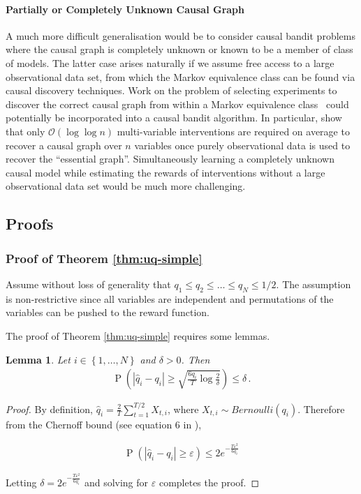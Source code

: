 \documentclass[11pt,a4paper,twoside]{report}
\newcommand{\set}[1]{\left\{#1\right\}}
\newcommand{\eq}[1]{\begin{align*}#1\end{align*}}
\newcommand{\bigo}[1]{\mathcal{O}\left( #1 \right)}
\renewcommand{\P}[1]{\operatorname{P}\left(#1\right)}
\theoremstyle{plain}
\newtheorem{lemma}[theorem]{Lemma}
\theoremstyle{definition}
\let\epsilon\varepsilon
\begin{document}
\paragraph{Partially or Completely Unknown Causal Graph}
A much more difficult generalisation would be to consider causal bandit problems where the causal graph is completely unknown or known to be a member of class of models.
The latter case arises naturally if we assume free access to a large observational data set, from which the Markov equivalence class can be found via causal discovery techniques. 
Work on the problem of selecting experiments to discover the correct causal graph from within a Markov equivalence class~\citep{eberhardt2005,eberhardt2010causal,hauser2014two,Hu2014} could potentially be incorporated into a causal bandit algorithm.
In particular, \citet{Hu2014} show that only $\bigo{\log \log n}$ multi-variable interventions are required on average to recover a causal graph over $n$ variables once purely observational data is used to recover the ``essential graph''.
Simultaneously learning a completely unknown causal model while estimating the rewards of interventions without a large observational data set would be much more challenging.

\subsection{Proofs}
\subsubsection{Proof of Theorem \ref{thm:uq-simple}}\label{sec:thm:uq-simple}


Assume without loss of generality that $q_1 \leq q_2 \leq \ldots \leq q_N \leq 1/2$. The assumption is non-restrictive since all variables
are independent and permutations of the variables can be pushed to the reward function. 

The proof of Theorem \ref{thm:uq-simple} requires some lemmas. \

\begin{lemma}\label{lem:conc1}
Let $i \in \set{1,\ldots, N}$ and $\delta > 0$. Then
\eq{
\P{\left|\hat q_i - q_i\right| \geq \sqrt{\frac{6q_i}{T} \log \frac{2}{\delta}}} \leq \delta\,.
}
\end{lemma}

\begin{proof}
By definition, $\hat{q}_i = \frac{2}{T}\sum_{t=1}^{T/2}X_{t,i}$, where $X_{t,i} \sim Bernoulli(q_i)$. Therefore from the Chernoff bound (see equation 6 in \citet{Hagerup1990}),

\eq{
\P{\left|\hat q_i - q_i\right| \geq \epsilon} \leq 2e^{-\frac{T\epsilon^2}{6q_i}}
}

Letting $\delta = 2e^{-\frac{T\epsilon^2}{6q_i}}$ and solving for $\epsilon$ completes the proof.

\end{proof}
\end{document}
